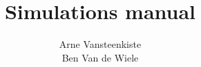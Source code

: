 \documentclass[a4paper, twoside]{article}
\newcommand{\doctitle}{Simulations manual}
\begin{document}
\hypersetup{breaklinks=true}
\setlength{\parindent}{0cm}

\title{\doctitle}
\author{Arne Vansteenkiste\\Ben Van de Wiele}
\maketitle


\tableofcontents





\appendix


%

\printindex
\end{document}
